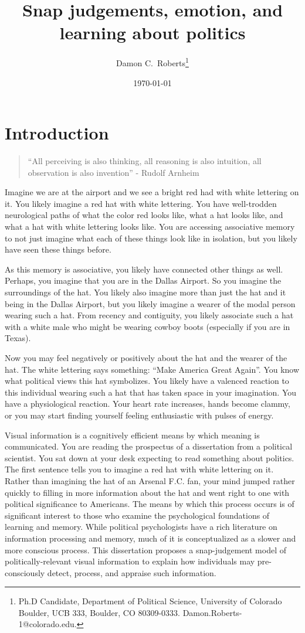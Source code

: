 \documentclass [12pt]{article}
\title{Snap judgements, emotion, and learning about politics}
\author{Damon C.\ Roberts\footnote{Ph.D Candidate,
Department of Political Science, University of Colorado Boulder, UCB 333, Boulder, CO 80309-0333. Damon.Roberts-1@colorado.edu.}}
\date{\today}
\begin{document}
\maketitle


\newpage
\doublespace
\newpage
\section*{Introduction}

\begin{quote}
    ``All perceiving is also thinking, all reasoning is also intuition, all observation is also invention'' - Rudolf Arnheim
\end{quote}

Imagine we are at the airport and we see a bright red had with white lettering on it. You likely imagine a red hat with white lettering. You have well-trodden neurological paths of what the color red looks like, what a hat looks like, and what a hat with white lettering looks like. You are accessing associative memory to not just imagine what each of these things look like in isolation, but you likely have seen these things before. 

As this memory is associative, you likely have connected other things as well. Perhaps, you imagine that you are in the Dallas Airport. So you imagine the surroundings of the hat. You likely also imagine more than just the hat and it being in the Dallas Airport, but you likely imagine a wearer of the modal person wearing such a hat. From recency and contiguity, you likely associate such a hat with a white male who might be wearing cowboy boots (especially if you are in Texas).

Now you may feel negatively or positively about the hat and the wearer of the hat. The white lettering says something: ``Make America Great Again''. You know what political views this hat symbolizes. You likely have a valenced reaction to this individual wearing such a hat that has taken space in your imagination. You have a physiological reaction. Your heart rate increases, hands become clammy, or you may start finding yourself feeling enthusiastic with pulses of energy.

Visual information is a cognitively efficient means by which meaning is communicated. You are reading the prospectus of a dissertation from a political scientist. You sat down at your desk expecting to read something about politics. The first sentence tells you to imagine a red hat with white lettering on it. Rather than imagining the hat of an Arsenal F.C. fan, your mind jumped rather quickly to filling in more information about the hat and went right to one with political significance to Americans. The means by which this process occurs is of significant interest to those who examine the psychological foundations of learning and memory. While political psychologists have a rich literature on information processing and memory, much of it is conceptualized as a slower and more conscious process. This dissertation proposes a snap-judgement model of politically-relevant visual information to explain how individuals may pre-consciously detect, process, and appraise such information. 
\end{document}
